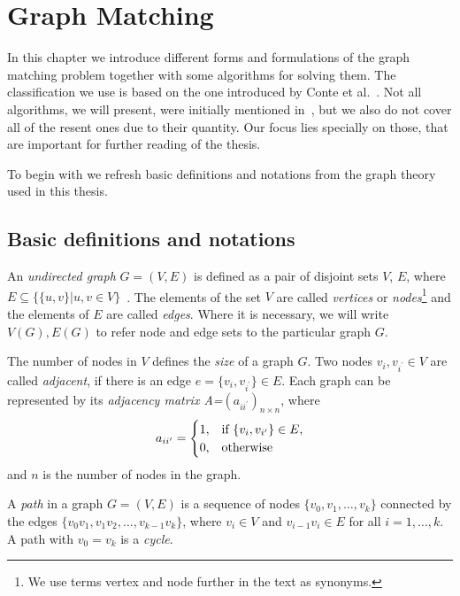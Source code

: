 
\chapter{Graph Matching} \label{chapter:GM}
In this chapter we introduce different forms and formulations of the graph matching problem together with some algorithms for solving them.
The classification we use is based on the one introduced by Conte et al.~\cite{Conte2004}. Not all algorithms, we will present, were initially mentioned in~\cite{Conte2004}, but we also do not cover all of the resent ones due to their quantity. Our focus lies specially on those, that are important for further reading of the thesis.

To begin with we refresh basic definitions and notations from the graph theory used in this thesis.
\section{Basic definitions and notations}
An \emph{undirected graph} $G=(V,E)$ is defined as a pair of disjoint sets $V$, $E$, where $E\subseteq\{\{u,v\}| u, v\in V\}$~\cite{Diestel2000}. The elements of the set $V$ are called \emph{vertices} or \emph{nodes}\footnote{We use terms vertex and node further in the text as synonyms.} and the elements of $E$ are called \emph{edges}. Where it is necessary, we will write $V(G), E(G)$ to refer node and edge sets to the particular graph $G$.

The number of nodes in $V$ defines the \emph{size} of a graph $G$.
Two nodes $v_{i},v_{i^\prime}\in V$ are called \emph{adjacent}, if there is an edge $e=\{v_{i},v_{i^\prime}\}\in E$. Each graph can be represented by its \emph{adjacency matrix A=$(a_{ii^\prime})_{n\times n}$}, where 
\begin{equation*}\centering
a_{ii^\prime}=\begin{cases}
 1, & \text{if } \{v_{i},v_{i^\prime}\}\in E, \\
 0, & \text{otherwise} \\
\end{cases}
\end{equation*}
and $n$ is the number of nodes in the graph.

A \emph{path} in a graph $G=(V,E)$ is a sequence of nodes $\{v_0,v_1,\dots,v_k\}$ connected by the edges $\{v_0v_1,v_1v_2,\dots,v_{k-1}v_k\}$, where $v_i\in V$ and $v_{i-1}v_i\in E$ for all $i=1,\dots,k$. A path with $v_0=v_k$ is a \emph{cycle}.

